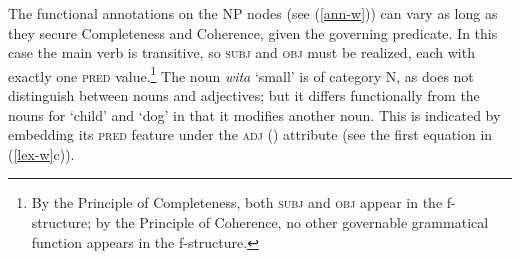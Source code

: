 \ex 
{\qquad{}}

\ex 
{\qquad{}}
    
\ex 
{\qquad{}} 
        
\zl


\ea
\label{fs-w} 
\z
The functional annotations on the NP nodes (see (\ref{ann-w})) can vary as long as they secure Completeness and Coherence, given the governing predicate.  In this case the main verb is transitive, so \textsc{subj} and \textsc{obj} must be realized, each with exactly one \textsc{pred} value.\footnote{By the Principle of Completeness, both \textsc{subj} and \textsc{obj} appear in the f-structure; by the Principle of Coherence, no other governable grammatical function appears in the f-structure.}  The noun \textit{wita} `small' is of category N, as  does not distinguish between nouns and adjectives; but it differs functionally from the nouns for `child' and `dog' in that it modifies another noun.  This is indicated by embedding its \textsc{pred} feature under the \textsc{adj} () attribute (see the first equation in (\ref{lex-w}c)).


